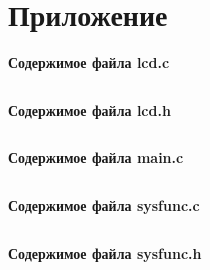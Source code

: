 \section{Приложение}
\textbf{Содержимое файла lcd.c}
\inputminted{c}{source/lcd.c}
\textbf{Содержимое файла lcd.h}
\inputminted{c}{source/lcd.h}
\textbf{Содержимое файла main.c}
\inputminted{c}{source/main.c}
\textbf{Содержимое файла sysfunc.c}
\inputminted{c}{source/sysfunc.c}
\textbf{Содержимое файла sysfunc.h}
\inputminted{c}{source/sysfunc.h}
